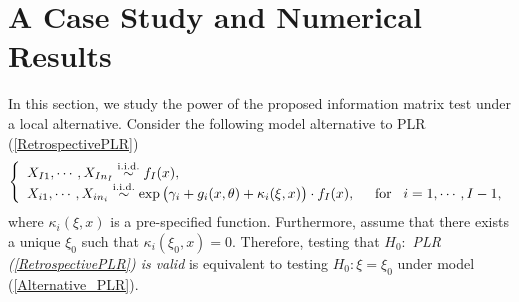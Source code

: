 \documentclass[12]{interact}
\theoremstyle{plain}%
\theoremstyle{definition}
\theoremstyle{remark}
\begin{document}
\section{A Case Study and Numerical Results}\label{sec5}
In this section, we study the power of the proposed information matrix test under a local alternative. Consider the following model alternative to PLR (\ref{RetrospectivePLR})
\begin{equation}
	\left\{ \begin{array}{llll}
		$$X_{I1}, \cdots, X_{In_I} \stackrel{\mathrm{ i.i.d.}}{\sim}f_{I}(x),\hspace{1.in}$$\\
		$$X_{i1}, \cdots, X_{in_i} \stackrel{\mathrm{ i.i.d.}}
		{\sim} \exp\big(\gamma_i+g_i(x,\theta)+\kappa_i(\xi, x)\big)\cdot f_I(x),
		\hspace{5mm}\mbox{for}\hspace{3mm} i = 1, \cdots, I-1,$$
	\end{array}\right.
	\label{Alternative_PLR}
\end{equation}
where $\kappa_i(\xi, x)$ is a pre-specified function. Furthermore, assume that there exists a unique $\xi_0$ such that $\kappa_i(\xi_0, x)=0$. Therefore, testing that $H_0:$ {\em PLR (\ref{RetrospectivePLR}) is valid} is equivalent to testing $H_0: \xi=\xi_0$ under model (\ref{Alternative_PLR}).
\end{document}
